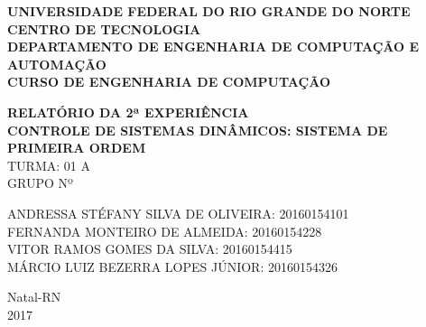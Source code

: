 \documentclass[a4paper,12pt]{article}
\begin{document}
\onehalfspacing

\thispagestyle{empty}

\setcounter{page}{1}


\begin{figure}[!ht]

\centering

\hspace{11.09cm}

\label{Logos}

\end{figure}


\vspace{-1cm}

\begin{center}
{\bf{\normalsize UNIVERSIDADE FEDERAL DO RIO GRANDE DO NORTE\\
CENTRO DE TECNOLOGIA\\
DEPARTAMENTO DE ENGENHARIA DE COMPUTAÇÃO E AUTOMAÇÃO\\
CURSO DE ENGENHARIA DE COMPUTAÇÃO
}}


\vspace{3.6cm}

{\bf{\large RELATÓRIO DA 2ª EXPERIÊNCIA\\
CONTROLE DE SISTEMAS DINÂMICOS: SISTEMA DE PRIMEIRA ORDEM\\
}}
\vspace{1.5cm}
{\large TURMA: 01 A\\
	GRUPO Nº}

\vspace{3.6cm}


\begin{flushright}
\begin{normalsize}
ANDRESSA STÉFANY SILVA DE OLIVEIRA: 20160154101\\
\vspace{0.8cm}
FERNANDA MONTEIRO DE ALMEIDA: 20160154228\\
\vspace{0.8cm}
VITOR RAMOS GOMES DA SILVA: 20160154415\\
\vspace{0.8cm}
MÁRCIO LUIZ BEZERRA LOPES JÚNIOR: 20160154326\\
\end{normalsize}
\end{flushright}


\vspace{2.5cm}

{\large Natal-RN\\
2017}

\end{center}
\end{document}
